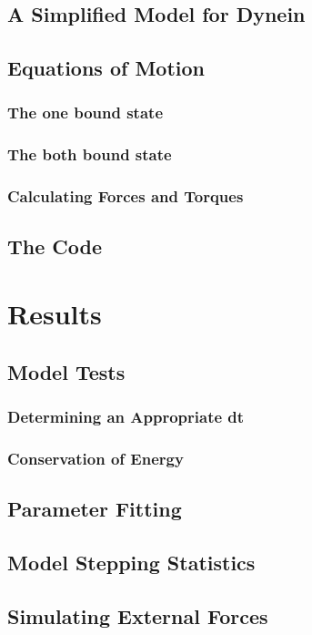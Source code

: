 \documentclass{article}
\begin{document}
\subsection{A Simplified Model for Dynein}
\subsection{Equations of Motion}
\subsubsection{The one bound state}
\subsubsection{The both bound state}
\subsubsection{Calculating Forces and Torques}
\subsection{The Code}

\section{Results}
\subsection{Model Tests}
\subsubsection{Determining an Appropriate dt}
\subsubsection{Conservation of Energy}

\subsection{Parameter Fitting}
\subsection{Model Stepping Statistics}
\subsection{Simulating External Forces}
\end{document}
